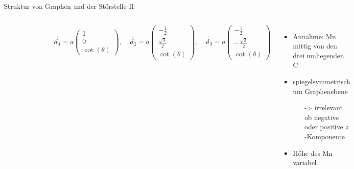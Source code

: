 \documentclass[aspectratio=1610, 9pt]{beamer}
\begin{document}
\begin{frame}{Struktur von Graphen und der Störstelle II}
\begin{columns}
    \begin{figure}
      \centering
      \qquad
    \end{figure}
    \begin{equation*}
      \vec{d}_1 = a \begin{pmatrix} 1            \\[4pt] 0                   \\[2pt] \cot (\theta)\end{pmatrix}, \quad
      \vec{d}_2 = a \begin{pmatrix} -\frac{1}{2} \\[4pt] \frac{\sqrt{3}}{2}  \\[2pt] \cot (\theta)\end{pmatrix}, \quad 
      \vec{d}_3 = a \begin{pmatrix} -\frac{1}{2} \\[4pt] -\frac{\sqrt{3}}{2} \\[2pt] \cot (\theta)\end{pmatrix} 
    \end{equation*}
    \begin{itemize}
      \item Annahme: Mn mittig von den drei umliegenden C
      \item spiegelsymmetrisch um Graphenebene 
      \begin{itemize}
        \item[->] irrelevant ob negative oder positive $z$-Komponente
      \end{itemize}
      \item Höhe des Mn variabel
    \end{itemize}
    \pause
    \vspace*{1cm}

\end{columns}
\end{frame}
\end{document}
